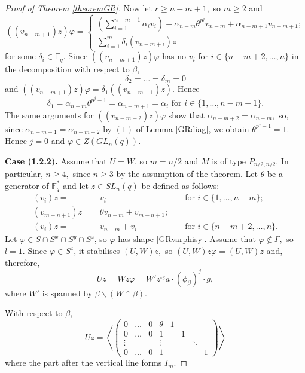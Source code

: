 \begin{proof}[Proof of Theorem {\rm \ref{theoremGR}}]
Now let $r\ge n-m+1,$ so $m\ge 2$ and 
\begin{equation*}((v_{n-m+1})z) \varphi=
\begin{cases}
\left(\sum_{i=1}^{n-m-1} \alpha_i v_i \right) + \alpha_{n-m} \theta^{p^j} v_{n-m} + \alpha_{n-m+1} v_{n-m+1};\\
\sum_{i=1}^m \delta_i (v_{n-m+i})z
\end{cases}
\end{equation*}
for some $\delta_i \in \mathbb{F}_q.$ Since $((v_{n-m+1})z) \varphi$ has no $v_i$ for $i \in \{n-m+2, \ldots, n\}$ in the decomposition with respect to $\beta$, 
$$\delta_2 = \ldots = \delta_m =0$$
and $((v_{n-m+1})z) \varphi= \delta_1 ((v_{n-m+1})z).$ Hence 
$$\delta_1 = \alpha_{n-m} \theta^{p^j-1}=\alpha_{n-m+1} = \alpha_i \text{ for } i \in \{1, \ldots, n-m-1\}.$$
The same arguments for $((v_{n-m+2})z) \varphi$ show that $\alpha_{n-m+2}=\alpha_{n-m},$ so, since $\alpha_{n-m+1}=\alpha_{n-m+2}$ by $(1)$ of Lemma \ref{GRdiag}, we obtain $\theta^{p^j-1}=1.$ Hence $j=0$ and $\varphi \in Z(GL_n(q)).$
 



\medskip
{\bf Case (1.2.2).} Assume that $U=W$, so $m=n/2$ and $M$ is of type $P_{n/2,n/2}.$ In particular, $n \ge 4,$ since $n \ge 3$ by the assumption of the theorem.  Let $\theta$ be a generator of $\mathbb{F}_q^*$ and let $z \in SL_n(q)$ be defined as follows: 
\begin{equation}
\label{GRzdef2}
\begin{aligned}
(v_i)z= &v_i &&\text{ for } i \in \{1, \ldots, n-m\}; \\
(v_{m-n+1})z= & \theta v_{n-m} + v_{m-n+1}; &&\\
(v_i)z= & v_{n-m} + v_{i} && \text{ for } i \in \{n-m+2, \ldots, n\}.
\end{aligned} 
\end{equation}
  Let $\varphi \in S \cap S^x \cap S^y \cap S^z$, so $\varphi$ has shape \eqref{GRvarphisy}.  Assume that $\varphi \notin \Gamma,$ so $l=1.$ Since $\varphi \in S^z$, it stabilises $(U,W)z,$ so $(U,W)z \varphi =(U,W)z$ and, therefore, 
$$Uz=Wz \varphi = W'z^{\iota_{\beta}}a\cdot (\phi_{\beta})^j \cdot g,$$
where $W'$ is spanned by $\beta \backslash (W \cap \beta).$  

 With respect to $\beta$,
$$Uz= \left \langle 
\left(\begin{array}{cccc|cccc}
0 & \ldots & 0 &  \theta & 1 & & &  \\
0 & \ldots & 0 &  1      &   & 1 & &  \\
\vdots &  &  & \vdots &  & &\ddots & \\
0 & \ldots & 0 & 1 &  & & & 1 
\end{array}\right)
\right \rangle$$
where the part after the vertical line forms $I_m.$


\end{proof}

